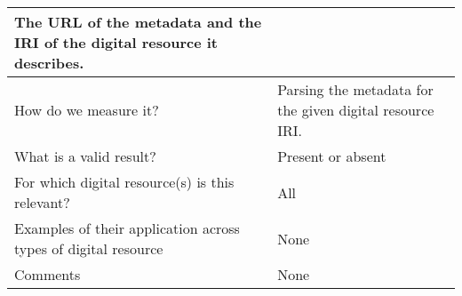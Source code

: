 \documentclass[english]{article}
\begin{document}
\begin{longtable}{|p{5cm}|p{9cm}|}
The URL of the metadata and the IRI of the digital resource it describes.


 \\



\hline
How do we measure it? &  

Parsing the metadata for the given digital resource IRI.

\\



\hline
What is a valid result? &  


Present or absent


\\



\hline
For which digital resource(s) is this relevant? &  All\\



\hline
Examples of their application across types of digital resource &  

None


\\



\hline

Comments & 


None

 \\ 
\hline

\end{longtable}
\end{document}
